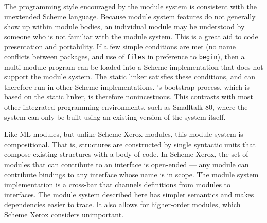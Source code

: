 The programming style encouraged by the module system is consistent
with the unextended Scheme language.  Because module system features
do not generally show up within module bodies, an individual module
may be understood by someone who is not familiar with the module
system.  This is a great aid to code presentation and portability.  If
a few simple conditions are met (no name conflicts between packages,
and use of {\tt files} in preference to
{\tt begin}), then a multi-module program can be loaded into a Scheme
implementation that does not support the module system.  The \hack{}
static linker satisfies these conditions, and can therefore run in
other Scheme implementations.  \hack{}'s bootstrap process, which is
based on the static linker, is therefore nonincestuous.  This
contrasts with most other integrated programming environments, such as
Smalltalk-80, where the system can only be built using an existing
version of the system itself.

Like ML modules, but unlike Scheme Xerox modules, this module system
is compositional.  That is, structures are constructed by single
syntactic units that compose existing structures with a body of code.
In Scheme Xerox, the set of modules that can contribute to an
interface is open-ended --- any module can contribute bindings to any
interface whose name is in scope.  The module system implementation is
a cross-bar that channels definitions from modules to interfaces.  The
module system described here has simpler semantics and makes
dependencies easier to trace.  It also allows for higher-order
modules, which Scheme Xerox considers unimportant.

%
%

